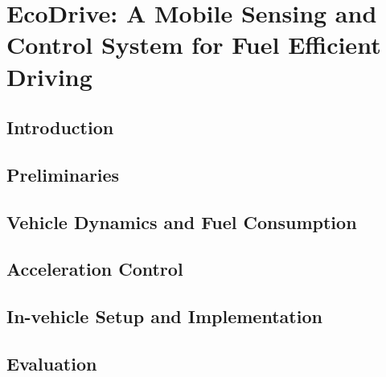 
\chapter{EcoDrive: A Mobile Sensing and Control System for Fuel Efficient Driving}


\section{Introduction}




\section{Preliminaries}




\section{Vehicle Dynamics and Fuel Consumption}






\section{Acceleration Control}




\section{In-vehicle Setup and Implementation}




\section{Evaluation}





